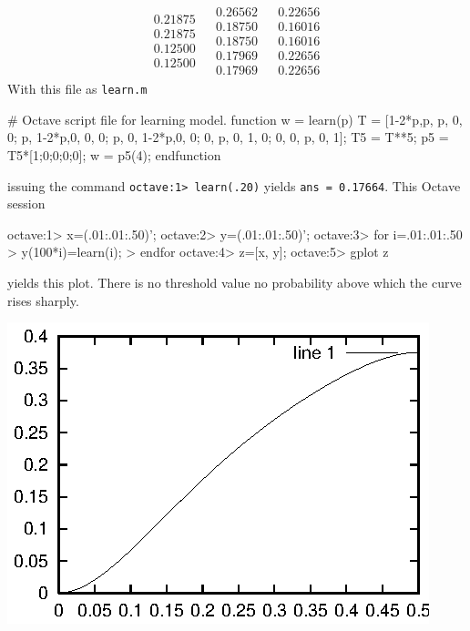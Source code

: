 \begin{ans}{4}
\begin{exparts}
\begin{equation*}
\begin{array}{cc|ccccc}
\begin{array}{c}
              0.21875 \\
              0.21875 \\
              0.12500 \\
              0.12500
            \end{array}
            &\begin{array}{c}
              0.26562 \\
              0.18750 \\
              0.18750 \\
              0.17969 \\
              0.17969
            \end{array}
            &\begin{array}{c}
              0.22656 \\
              0.16016 \\
              0.16016 \\
              0.22656 \\
              0.22656
            \end{array}
          \end{array}
        \end{equation*}
       \partsitem With this file as \texttt{learn.m}
\begin{computercode}
# Octave script file for learning model.
function w = learn(p)
   T = [1-2*p,p,    p,    0, 0;
        p,    1-2*p,0,    0, 0;
        p,    0,    1-2*p,0, 0;
        0,    p,    0,    1, 0;
        0,    0,    p,    0, 1];
  T5 = T**5;
  p5 = T5*[1;0;0;0;0];
  w = p5(4);
endfunction
\end{computercode}
        issuing the command \texttt{octave:1> learn(.20)} yields
        \texttt{ans = 0.17664}.
       \partsitem This Octave session
\begin{computercode}
octave:1> x=(.01:.01:.50)';
octave:2> y=(.01:.01:.50)';
octave:3> for i=.01:.01:.50
>           y(100*i)=learn(i);
>         endfor
octave:4> z=[x, y];
octave:5> gplot z
\end{computercode}
        yields this plot.
        There is no threshold value \Dash  no probability above which the
        curve rises sharply.
        \begin{center}
          \includegraphics{learn5.eps}

\end{center}
\end{exparts}
\end{ans}
